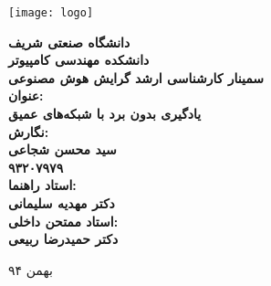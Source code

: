 \thispagestyle{empty}
\begin{center}
\texttt{[image: logo]}
\vskip 1cm
{\bf
دانشگاه صنعتی شریف\\ دانشکده مهندسی کامپیوتر\\ سمینار کارشناسی ارشد گرایش هوش مصنوعی\\
\vskip 1cm
عنوان:\\
یادگیری بدون برد با شبکه‌های عمیق\\
\vskip 1cm
نگارش:\\
سید محسن شجاعی\\
۹۳۲۰۷۹۷۹\\
\vskip 1cm
استاد راهنما:\\
دکتر مهدیه سلیمانی\\
\vskip 1cm
استاد ممتحن داخلی:\\
دکتر حمیدرضا ربیعی\\

\vskip 3.5cm

}
بهمن ۹۴
\newpage
\end{center}


